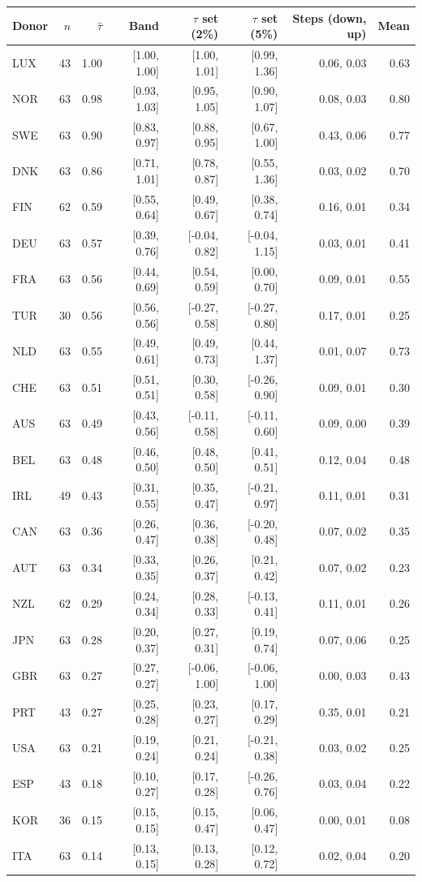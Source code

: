 \begin{tabular}{lrrrrrrr}\toprule
Donor & $n$ & $\hat\tau$ & Band & $\tau$ set (2\%) & $\tau$ set (5\%) & Steps (down, up) & Mean\\\midrule
LUX & 43 & 1.00 & [1.00, 1.00] & [1.00, 1.01] & [0.99, 1.36] & 0.06, 0.03 & 0.63\\
NOR & 63 & 0.98 & [0.93, 1.03] & [0.95, 1.05] & [0.90, 1.07] & 0.08, 0.03 & 0.80\\
SWE & 63 & 0.90 & [0.83, 0.97] & [0.88, 0.95] & [0.67, 1.00] & 0.43, 0.06 & 0.77\\
DNK & 63 & 0.86 & [0.71, 1.01] & [0.78, 0.87] & [0.55, 1.36] & 0.03, 0.02 & 0.70\\
FIN & 62 & 0.59 & [0.55, 0.64] & [0.49, 0.67] & [0.38, 0.74] & 0.16, 0.01 & 0.34\\
DEU & 63 & 0.57 & [0.39, 0.76] & [-0.04, 0.82] & [-0.04, 1.15] & 0.03, 0.01 & 0.41\\
FRA & 63 & 0.56 & [0.44, 0.69] & [0.54, 0.59] & [0.00, 0.70] & 0.09, 0.01 & 0.55\\
TUR & 30 & 0.56 & [0.56, 0.56] & [-0.27, 0.58] & [-0.27, 0.80] & 0.17, 0.01 & 0.25\\
NLD & 63 & 0.55 & [0.49, 0.61] & [0.49, 0.73] & [0.44, 1.37] & 0.01, 0.07 & 0.73\\
CHE & 63 & 0.51 & [0.51, 0.51] & [0.30, 0.58] & [-0.26, 0.90] & 0.09, 0.01 & 0.30\\
AUS & 63 & 0.49 & [0.43, 0.56] & [-0.11, 0.58] & [-0.11, 0.60] & 0.09, 0.00 & 0.39\\
BEL & 63 & 0.48 & [0.46, 0.50] & [0.48, 0.50] & [0.41, 0.51] & 0.12, 0.04 & 0.48\\
IRL & 49 & 0.43 & [0.31, 0.55] & [0.35, 0.47] & [-0.21, 0.97] & 0.11, 0.01 & 0.31\\
CAN & 63 & 0.36 & [0.26, 0.47] & [0.36, 0.38] & [-0.20, 0.48] & 0.07, 0.02 & 0.35\\
AUT & 63 & 0.34 & [0.33, 0.35] & [0.26, 0.37] & [0.21, 0.42] & 0.07, 0.02 & 0.23\\
NZL & 62 & 0.29 & [0.24, 0.34] & [0.28, 0.33] & [-0.13, 0.41] & 0.11, 0.01 & 0.26\\
JPN & 63 & 0.28 & [0.20, 0.37] & [0.27, 0.31] & [0.19, 0.74] & 0.07, 0.06 & 0.25\\
GBR & 63 & 0.27 & [0.27, 0.27] & [-0.06, 1.00] & [-0.06, 1.00] & 0.00, 0.03 & 0.43\\
PRT & 43 & 0.27 & [0.25, 0.28] & [0.23, 0.27] & [0.17, 0.29] & 0.35, 0.01 & 0.21\\
USA & 63 & 0.21 & [0.19, 0.24] & [0.21, 0.24] & [-0.21, 0.38] & 0.03, 0.02 & 0.25\\
ESP & 43 & 0.18 & [0.10, 0.27] & [0.17, 0.28] & [-0.26, 0.76] & 0.03, 0.04 & 0.22\\
KOR & 36 & 0.15 & [0.15, 0.15] & [0.15, 0.47] & [0.06, 0.47] & 0.00, 0.01 & 0.08\\
ITA & 63 & 0.14 & [0.13, 0.15] & [0.13, 0.28] & [0.12, 0.72] & 0.02, 0.04 & 0.20\\
\bottomrule\end{tabular}